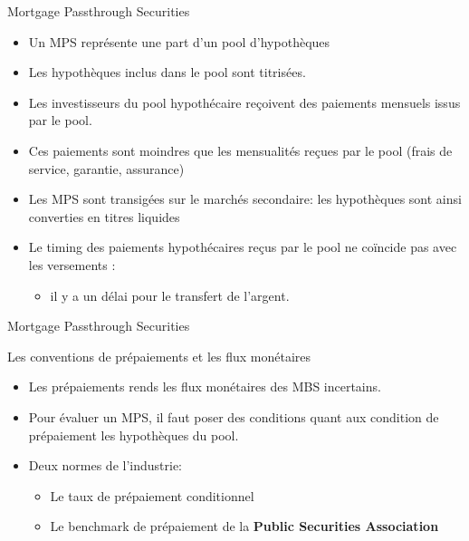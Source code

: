 \documentclass{beamer}
\begin{document}
\begin{frame}{Mortgage Passthrough Securities}
\begin{itemize}[label=\bullet]
\item Un MPS représente une part d’un pool d’hypothèques
\item Les hypothèques inclus dans le pool sont titrisées.
\item Les investisseurs du pool hypothécaire reçoivent des paiements mensuels issus par le pool.
\item Ces paiements sont moindres que les mensualités reçues par le pool (frais de service, garantie, assurance)
\item Les MPS sont transigées sur le marchés secondaire: les hypothèques sont ainsi converties en titres liquides
\item Le timing des paiements hypothécaires reçus par le pool ne coïncide pas avec les versements : 
\begin{itemize}[label=\bullet]
\item il y a un délai pour le transfert de l’argent.
\end{itemize}
\end{itemize}

\end{frame}

\begin{frame}{Mortgage Passthrough Securities}
\begin{block}{Les conventions de prépaiements et les flux monétaires}
\begin{itemize}[label=\bullet]
\item Les prépaiements rends les flux monétaires des MBS incertains.
\item Pour évaluer un MPS, il faut poser des conditions quant aux condition de prépaiement les hypothèques du pool.
\item Deux normes de l’industrie:
\begin{itemize}[label=\bullet]
\item Le taux de prépaiement conditionnel
\item Le benchmark de prépaiement de la \textbf{Public Securities Association}
\end{itemize}
\end{itemize}
\end{block}
\end{frame}
\end{document}
